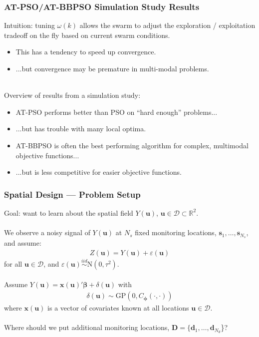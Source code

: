 \documentclass[xcolor=dvipsnames]{beamer}
\begin{document}
\begin{frame}
\frametitle{AT-PSO/AT-BBPSO Simulation Study Results}
Intuition: tuning $\omega(k)$ allows the swarm to adjust the exploration / exploitation tradeoff on the fly based on current swarm conditions.\\
\begin{itemize}
\item This has a tendency to speed up convergence.\\
\item ...but convergence may be premature in multi-modal problems.\\~\\
\end{itemize}

\pause

Overview of results from a simulation study:
\begin{itemize}
\item AT-PSO performs better than PSO on ``hard enough'' problems... 
\item ...but has trouble with many local optima.\pause
\item AT-BBPSO is often the best performing algorithm for complex, multimodal objective functions...
\item ...but is less competitive for easier objective functions.
\end{itemize}
\end{frame}

\begin{frame}
\frametitle{Spatial Design --- Problem Setup}
Goal: want to learn about the spatial field $Y(\bm{u})$, $\bm{u}\in\mathcal{D}\subset \mathbb{R}^2$. \pause\\~\\

We observe a noisy signal of $Y(\bm{u})$ at $N_s$ fixed monitoring locations, $\bm{s}_1, \dots, \bm{s}_{N_s}$,
and assume:
\begin{align*}
Z(\bm{u}) = Y(\bm{u}) + \varepsilon(\bm{u})
\end{align*}
for all $\bm{u}\in\mathcal{D}$, and $\varepsilon(\bm{u}) \stackrel{iid}{\sim} \mathrm{N}(0, \tau^2)$. \pause\\~\\

Assume $Y(\bm{u}) = \bm{x}(\bm{u})'\bm{\beta} + \delta(\bm{u})$ with
\begin{align*}
\delta(\bm{u}) \sim \mathrm{GP}(0, C_{\bm{\phi}}(\cdot, \cdot))
\end{align*}
where $\bm{x}(\bm{u})$ is a vector of covariates known at all locations $\bm{u}\in\mathcal{D}$. \pause \\~\\

Where should we put additional monitoring locations, $\bm{D} = \{\bm{d}_1, \dots, \bm{d}_{N_d}$\}?
\end{frame}
\end{document}
